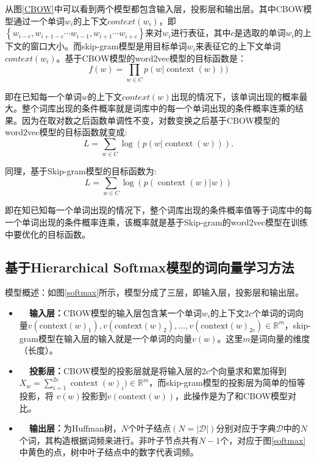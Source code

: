 从图\ref{CBOW}中可以看到两个模型都包含输入层，投影层和输出层。其中CBOW模型通过一个单词$w_i$的上下文$context(w_i)$，即$\left\{ w _ { i - c } , w _ { i + 1 - c } \cdots w _ { i - 1 } , w _ { i + 1 } \cdots w _ { i + c }\right\}$来对$w_i$进行表征，其中$c$是选取的单词$w_i$的上下文的窗口大小。而skip-gram模型是用目标单词$w_i$来表征它的上下文单词$context(w_i)$。基于CBOW模型的word2vec模型的目标函数是：
\begin{equation}
f ( w ) = \prod _ { w \in C } p ( w | \operatorname { context } ( w ) ) )
\end{equation}

即在已知每一个单词$w$的上下文$context(w)$出现的情况下，该单词出现的概率最大。整个词库出现的条件概率就是词库中的每一个单词出现的条件概率连乘的结果。因为在取对数之后函数单调性不变，对数变换之后基于CBOW模型的word2vec模型的目标函数就变成:
\begin{equation}
L = \sum _ { w \in C } \log \left( p \left( w | \operatorname { context } \left( w \right) \right) \right). 
\end{equation}

同理，基于Skip-gram模型的目标函数为:
\begin{equation}
L = \sum _ { w \in C } \log \left( p \left( \operatorname { context } \left( w \right) | w \right) \right)
\end{equation}

即在知已知每一个单词出现的情况下，整个词库出现的条件概率值等于词库中的每一个单词出现的条件概率连乘，该概率就是基于Skip-gram的word2vec模型在训练中要优化的目标函数。

\subsection{基于Hierarchical Softmax模型的词向量学习方法}

模型概述：如图\ref{softmax}所示，模型分成了三层，即输入层，投影层和输出层。
\begin{itemize}
    \item \textbf{~~输入层：}CBOW模型的输入层包含某一个单词$w_i$的上下文$2c$个单词的词向量$v \left( \text {context} ( w ) _ { 1 } \right) , v \left( \text {context} ( w ) _ { 2 } \right) , \ldots , v \left( \text {context} ( w ) _ { 2 c } \right) \in \mathbb { R } ^ { m }$，skip-gram模型在输入层的输入就是一个单词的向量$v(w)$。这里$m$是词向量的维度（长度）。
    \item \textbf{~~投影层：}CBOW模型的投影层就是将输入层的$2c$个向量求和累加得到$X _ { w } = \sum _ { i = 1 } ^ { 2 c } \operatorname { context } ( w ) _ { i } ) \in \mathbb { R } ^ { m }$，而skip-gram模型的投影层为简单的恒等投影，将 $v(w)$投影到$v(\text{context}(w))$，此操作是为了和CBOW模型对比。
    \item \textbf{~~输出层：}为Huffman树，$N$个叶子结点$(N=|\mathcal{D}|)$分别对应于字典$\mathcal{D}$中的$N$个词，其构造根据词频来进行。非叶子节点共有$N-1$个，对应于图\ref{softmax}中黄色的点，树中叶子结点中的数字代表词频。
\end{itemize}

